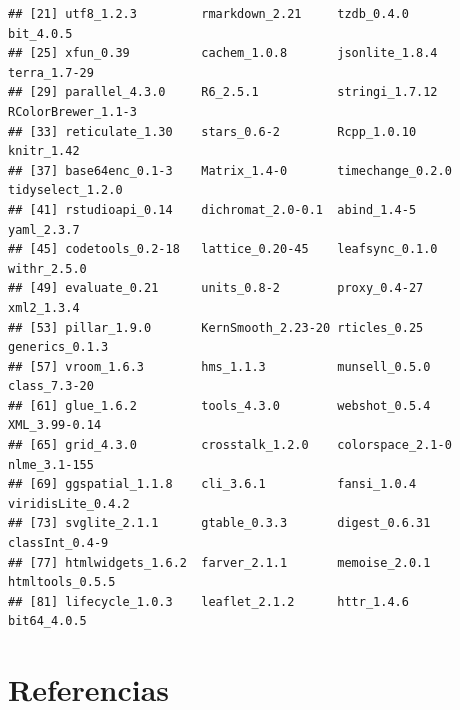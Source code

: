 \documentclass[spanish]{article}
\begin{document}
\begin{verbatim}
## [21] utf8_1.2.3         rmarkdown_2.21     tzdb_0.4.0         bit_4.0.5         
## [25] xfun_0.39          cachem_1.0.8       jsonlite_1.8.4     terra_1.7-29      
## [29] parallel_4.3.0     R6_2.5.1           stringi_1.7.12     RColorBrewer_1.1-3
## [33] reticulate_1.30    stars_0.6-2        Rcpp_1.0.10        knitr_1.42        
## [37] base64enc_0.1-3    Matrix_1.4-0       timechange_0.2.0   tidyselect_1.2.0  
## [41] rstudioapi_0.14    dichromat_2.0-0.1  abind_1.4-5        yaml_2.3.7        
## [45] codetools_0.2-18   lattice_0.20-45    leafsync_0.1.0     withr_2.5.0       
## [49] evaluate_0.21      units_0.8-2        proxy_0.4-27       xml2_1.3.4        
## [53] pillar_1.9.0       KernSmooth_2.23-20 rticles_0.25       generics_0.1.3    
## [57] vroom_1.6.3        hms_1.1.3          munsell_0.5.0      class_7.3-20      
## [61] glue_1.6.2         tools_4.3.0        webshot_0.5.4      XML_3.99-0.14     
## [65] grid_4.3.0         crosstalk_1.2.0    colorspace_2.1-0   nlme_3.1-155      
## [69] ggspatial_1.1.8    cli_3.6.1          fansi_1.0.4        viridisLite_0.4.2 
## [73] svglite_2.1.1      gtable_0.3.3       digest_0.6.31      classInt_0.4-9    
## [77] htmlwidgets_1.6.2  farver_2.1.1       memoise_2.0.1      htmltools_0.5.5   
## [81] lifecycle_1.0.3    leaflet_2.1.2      httr_1.4.6         bit64_4.0.5
\end{verbatim}

\hypertarget{referencias}{%
\section*{Referencias}\label{referencias}}
\end{document}
